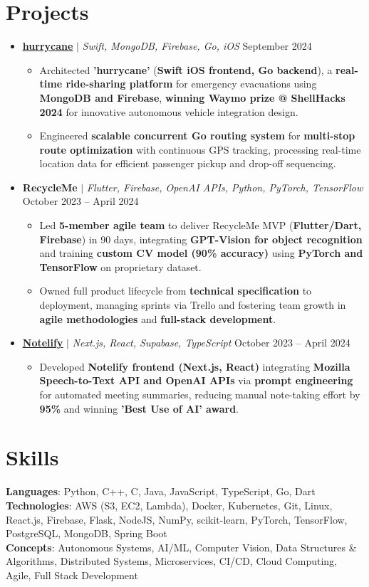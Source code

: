 \documentclass[letterpaper,11pt]{article}
\newcommand{\resumeItem}[1]{
  \item\small{
    {#1 \vspace{-2pt}}
  }
}
\newcommand{\resumeProjectHeading}[2]{
  \item
  \small#1 \hfill #2 \\
  \vspace{-7pt} %
}
\newcommand{\resumeSubHeadingListStart}{\begin{itemize}[leftmargin=0.15in, label={}]}
\newcommand{\resumeSubHeadingListEnd}{\end{itemize}}
\newcommand{\resumeItemListStart}{\begin{itemize}}
\newcommand{\resumeItemListEnd}{\end{itemize}\vspace{-5pt}}
\begin{document}
\section{Projects}
    \resumeSubHeadingListStart
    \resumeProjectHeading
          {\underline{\textbf {\href{https://github.com/keshavbabu/shellhacks/tree/main}{hurrycane}}} $|$ \emph{Swift, MongoDB, Firebase, Go, iOS}}{September 2024}
          \resumeItemListStart
            \resumeItem{Architected \textbf{'hurrycane'} (\textbf{Swift iOS frontend, Go backend}), a \textbf{real-time ride-sharing platform} for emergency evacuations using \textbf{MongoDB and Firebase}, \textbf{winning Waymo prize @ ShellHacks 2024} for innovative autonomous vehicle integration design.}
            \resumeItem{Engineered \textbf{scalable concurrent Go routing system} for \textbf{multi-stop route optimization} with continuous GPS tracking, processing real-time location data for efficient passenger pickup and drop-off sequencing.}
          \resumeItemListEnd
      \resumeProjectHeading
          {\textbf{RecycleMe} $|$ \emph{Flutter, Firebase, OpenAI APIs, Python, PyTorch, TensorFlow}}{October 2023 -- April 2024}
          \resumeItemListStart
            \resumeItem{Led \textbf{5-member agile team} to deliver RecycleMe MVP (\textbf{Flutter/Dart, Firebase}) in 90 days, integrating \textbf{GPT-Vision for object recognition} and training \textbf{custom CV model (90\% accuracy)} using \textbf{PyTorch and TensorFlow} on proprietary dataset.}
            \resumeItem{Owned full product lifecycle from \textbf{technical specification} to deployment, managing sprints via Trello and fostering team growth in \textbf{agile methodologies} and \textbf{full-stack development}.}
          \resumeItemListEnd
      \resumeProjectHeading
          {\underline{\textbf {\href{https://www.notelify.co/}{Notelify}}} $|$ \emph{Next.js, React, Supabase, TypeScript}}{October 2023 -- April 2024}
          \resumeItemListStart
            \resumeItem{Developed \textbf{Notelify frontend (Next.js, React)} integrating \textbf{Mozilla Speech-to-Text API and OpenAI APIs} via \textbf{prompt engineering} for automated meeting summaries, reducing manual note-taking effort by \textbf{95\%} and winning \textbf{'Best Use of AI' award}.}
          \resumeItemListEnd
    \resumeSubHeadingListEnd

\section{Skills}
 \begin{itemize}[leftmargin=0.15in, label={}]
    \small{\item{
     \textbf{Languages}{: Python, C++, C, Java, JavaScript, TypeScript, Go, Dart} \\
     \textbf{Technologies}{: AWS (S3, EC2, Lambda), Docker, Kubernetes, Git, Linux, React.js, Firebase, Flask, NodeJS, NumPy, scikit-learn, PyTorch, TensorFlow, PostgreSQL, MongoDB, Spring Boot} \\
     \textbf{Concepts}{: Autonomous Systems, AI/ML, Computer Vision, Data Structures \& Algorithms, Distributed Systems, Microservices, CI/CD, Cloud Computing, Agile, Full Stack Development} }}
 \end{itemize}
 
%
\end{document}
